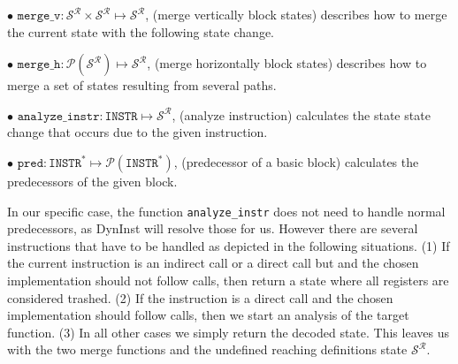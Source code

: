 $\bullet$ $\texttt{merge\_v} : \mathcal{S}^\mathcal{R} \times \mathcal{S}^\mathcal{R} \mapsto \mathcal{S}^\mathcal{R}$, (merge vertically block states) describes how to merge the current state with the following state change.

$\bullet$ $\texttt{merge\_h} : \mathcal{P}(\mathcal{S}^\mathcal{R}) \mapsto \mathcal{S}^\mathcal{R}$, (merge horizontally block states) describes how to merge a set of states resulting from several paths.

$\bullet$ $\texttt{analyze\_instr} : \texttt{INSTR} \mapsto \mathcal{S}^\mathcal{R}$, (analyze instruction) calculates the state state change that occurs due to the given instruction.

$\bullet$ $\texttt{pred} : \texttt{INSTR}^* \mapsto \mathcal{P}(\texttt{INSTR}^*)$, (predecessor of a basic block) calculates the predecessors of the given block.

In our specific case, the function \texttt{analyze\_instr} does not need to handle normal predecessors, as DynInst will resolve those for us. 
However there are several instructions that have to be handled as depicted in the following situations. 
(1) If the current instruction is an indirect call or a direct call 
but and the chosen implementation should not follow calls, then return a state where all registers are considered trashed. 
(2) If the instruction 
is a direct call and the chosen implementation should follow calls, then we start an analysis of the target function. 
(3) In all other cases we 
simply return the decoded state. This leaves us with the two merge functions and the undefined reaching definitions state $\mathcal{S}^\mathcal{R}$. 



